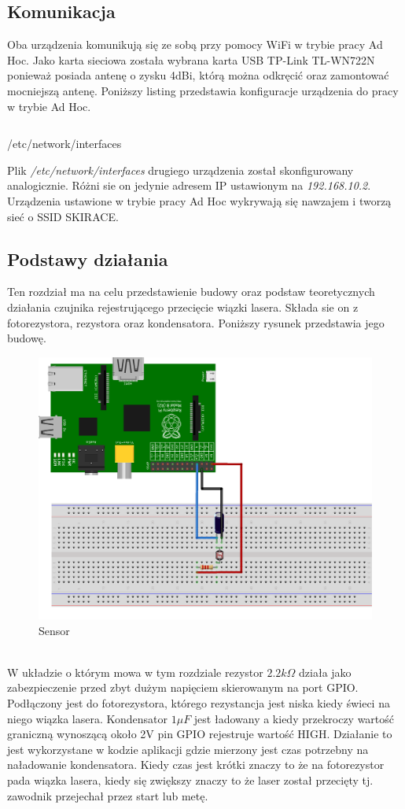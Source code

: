 \documentclass[11pt,a4paper, twoside]{article}
\begin{document}
\subsection{Komunikacja}
Oba urządzenia komunikują się ze sobą przy pomocy WiFi w trybie pracy Ad Hoc. Jako karta sieciowa została wybrana karta USB TP-Link \mbox{TL-WN722N} ponieważ posiada antenę o zysku 4dBi, którą można odkręcić oraz zamontować mocniejszą antenę. Poniższy listing przedstawia konfiguracje urządzenia do pracy w trybie Ad Hoc.
\begin{listing}[H]
\inputminted[linenos=true]{sh}{./src/adhoc}
\caption{/etc/network/interfaces}
\end{listing}
Plik \emph{/etc/network/interfaces} drugiego urządzenia został skonfigurowany analogicznie. Różni sie on jedynie adresem IP ustawionym na \emph{192.168.10.2}. Urządzenia ustawione w trybie pracy Ad Hoc wykrywają się nawzajem i tworzą sieć o SSID SKIRACE.
\newpage
\subsection{Podstawy działania}\label{sensor}
Ten rozdział ma na celu przedstawienie budowy oraz podstaw teoretycznych działania czujnika rejestrującego przecięcie wiązki lasera. Składa sie on z fotorezystora, rezystora oraz kondensatora. Poniższy rysunek przedstawia jego budowę.
\begin{figure}[h]
\includegraphics[scale=0.15]{./img/sensor_bb.png}
\caption{Sensor}
\end{figure}
\\\noindent
W układzie o którym mowa w tym rozdziale rezystor $2.2k \Omega$ działa jako zabezpieczenie przed zbyt dużym napięciem skierowanym na port GPIO. Podłączony jest do fotorezystora, którego rezystancja jest niska kiedy świeci na niego wiązka lasera. Kondensator $1\mu F$ jest ładowany a kiedy przekroczy wartość graniczną wynoszącą około 2V pin GPIO rejestruje wartość HIGH. Działanie to jest wykorzystane w kodzie aplikacji gdzie mierzony jest czas potrzebny na naładowanie kondensatora. Kiedy czas jest krótki znaczy to że na fotorezystor pada wiązka lasera, kiedy się zwiększy znaczy to że laser został przecięty tj. zawodnik przejechał przez start lub metę.
\newpage
\end{document}
